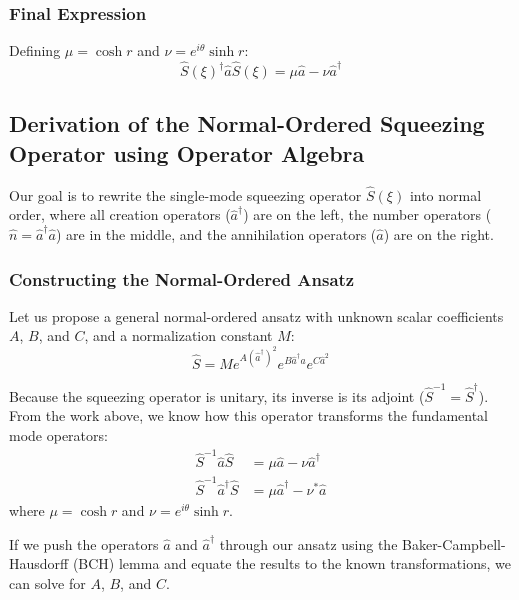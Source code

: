 {\subsubsection{Final Expression}
Defining $\mu = \cosh r$ and $\nu = e^{i\theta}\sinh r$:
\begin{equation}
\hat{S}(\xi)^\dagger \hat{a} \hat{S}(\xi) = \mu\hat{a} - \nu\hat{a}^\dagger
\end{equation}


\subsection{Derivation of the Normal-Ordered Squeezing Operator using Operator Algebra}

Our goal is to rewrite the single-mode squeezing operator $\hat{S}(\xi)$ into normal order, where all creation operators ($\hat{a}^\dagger$) are on the left, the number operators ($\hat{n} = \hat{a}^\dagger\hat{a}$) are in the middle, and the annihilation operators ($\hat{a}$) are on the right. 

\subsubsection{Constructing the Normal-Ordered Ansatz}
Let us propose a general normal-ordered ansatz with unknown scalar coefficients $A$, $B$, and $C$, and a normalization constant $M$:
\begin{equation*}
\hat{S} = M e^{A(\hat{a}^\dagger)^2} e^{B\hat{a}^\dagger\hat{a}} e^{C\hat{a}^2}
\end{equation*}

Because the squeezing operator is unitary, its inverse is its adjoint ($\hat{S}^{-1} = \hat{S}^\dagger$). From the work above, we know how this operator transforms the fundamental mode operators:
\begin{align*}
\hat{S}^{-1} \hat{a} \hat{S} &= \mu\hat{a} - \nu\hat{a}^\dagger \\
\hat{S}^{-1} \hat{a}^\dagger \hat{S} &= \mu\hat{a}^\dagger - \nu^*\hat{a}
\end{align*}
where $\mu = \cosh r$ and $\nu = e^{i\theta}\sinh r$. 

If we push the operators $\hat{a}$ and $\hat{a}^\dagger$ through our ansatz using the Baker-Campbell-Hausdorff (BCH) lemma and equate the results to the known transformations, we can solve for $A$, $B$, and $C$.

}

